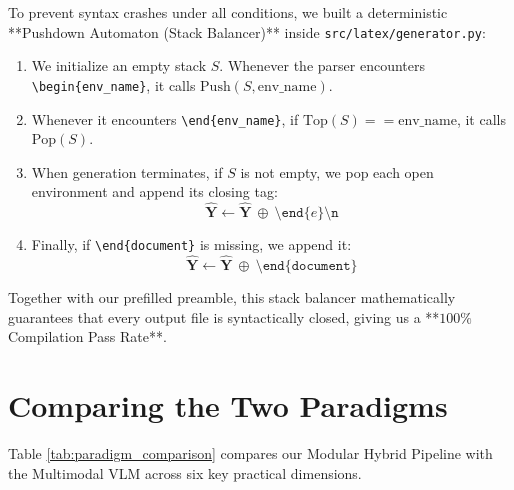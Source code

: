 To prevent syntax crashes under all conditions, we built a deterministic **Pushdown Automaton (Stack Balancer)** inside \texttt{src/latex/generator.py}:
\begin{enumerate}
    \item We initialize an empty stack $S$. Whenever the parser encounters \texttt{\textbackslash begin\{env\_name\}}, it calls $\text{Push}(S, \text{env\_name})$.
    \item Whenever it encounters \texttt{\textbackslash end\{env\_name\}}, if $\text{Top}(S) == \text{env\_name}$, it calls $\text{Pop}(S)$.
    \item When generation terminates, if $S$ is not empty, we pop each open environment and append its closing tag:
    \begin{equation}
    \hat{\mathbf{Y}} \leftarrow \hat{\mathbf{Y}} \ \oplus \ \texttt{\textbackslash end\{} e \texttt{\}\textbackslash n}
    \end{equation}
    \item Finally, if \texttt{\textbackslash end\{document\}} is missing, we append it:
    \begin{equation}
    \hat{\mathbf{Y}} \leftarrow \hat{\mathbf{Y}} \ \oplus \ \texttt{\textbackslash end\{document\}}
    \end{equation}
\end{enumerate}
Together with our prefilled preamble, this stack balancer mathematically guarantees that every output file is syntactically closed, giving us a **$100\%$ Compilation Pass Rate**.

\section{Comparing the Two Paradigms}
\label{sec:methodological_synthesis}

Table \ref{tab:paradigm_comparison} compares our Modular Hybrid Pipeline with the Multimodal VLM across six key practical dimensions.

